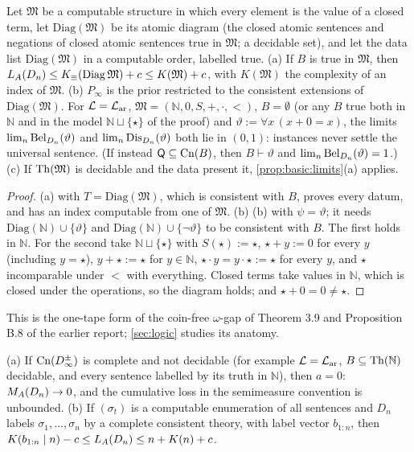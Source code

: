 \begin{proposition}\label{prop:basic:structures}
Let $\mathfrak M$ be a computable structure in which every element is the value of a closed term, let $\mathrm{Diag}(\mathfrak M)$ be its atomic diagram (the closed atomic sentences and negations of closed atomic sentences true in $\mathfrak M$; a decidable set), and let the data list $\mathrm{Diag}(\mathfrak M)$ in a computable order, labelled true.
(a) If $B$ is true in $\mathfrak M$, then $L_{A}(D_n)\le K_{\equiv}(\mathrm{Diag}\,\mathfrak M)+c\le K(\mathfrak M)+c$, with $K(\mathfrak M)$ the complexity of an index of $\mathfrak M$.
(b) $P_\infty$ is the prior restricted to the consistent extensions of $\mathrm{Diag}(\mathfrak M)$. For $\mathcal L=\mathcal{L}_{\mathrm{ar}}$, $\mathfrak M=(\mathbb N,0,S,+,\cdot,<)$, $B=\emptyset$ (or any $B$ true both in $\mathbb N$ and in the model $\mathbb N\sqcup\{\star\}$ of the proof) and $\vartheta:=\forall x\,(x+0=x)$, the limits $\lim_n\mathrm{Bel}_{D_n}(\vartheta)$ and $\lim_n\mathrm{Dis}_{D_n}(\vartheta)$ both lie in $(0,1)$: instances never settle the universal sentence. (If instead $\mathsf{Q}\subseteq\mathrm{Cn}(B)$, then $B\vdash\vartheta$ and $\lim_n\mathrm{Bel}_{D_n}(\vartheta)=1$.)
(c) If $\mathrm{Th}(\mathfrak M)$ is decidable and the data present it, \cref{prop:basic:limits}(a) applies.
\end{proposition}

\begin{proof}
(a)  with $T=\mathrm{Diag}(\mathfrak M)$, which is consistent with $B$, proves every datum, and has an index computable from one of $\mathfrak M$. (b) (b) with $\psi=\vartheta$; it needs $\mathrm{Diag}(\mathbb N)\cup\{\vartheta\}$ and $\mathrm{Diag}(\mathbb N)\cup\{\neg\vartheta\}$ to be consistent with $B$. The first holds in $\mathbb N$. For the second take $\mathbb N\sqcup\{\star\}$ with $S(\star):=\star$, $\star+y:=0$ for every $y$ (including $y=\star$), $y+\star:=\star$ for $y\in\mathbb N$, $\star\cdot y=y\cdot\star:=\star$ for every $y$, and $\star$ incomparable under $<$ with everything. Closed terms take values in $\mathbb N$, which is closed under the operations, so the diagram holds; and $\star+0=0\ne\star$.
\end{proof}

This is the one-tape form of the coin-free $\omega$-gap of Theorem 3.9 and Proposition B.8 of the earlier report; \cref{sec:logic} studies its anatomy.

\begin{proposition}\label{prop:basic:noncomplete}
(a) If $\mathrm{Cn}(D_\infty^\pm)$ is complete and not decidable (for example $\mathcal L=\mathcal{L}_{\mathrm{ar}}$, $B\subseteq\mathrm{Th}(\mathbb N)$ decidable, and every sentence labelled by its truth in $\mathbb N$), then $a=0$: $M_{A}(D_n)\to0$, and the cumulative loss in the semimeasure convention is unbounded.
(b) If $(\sigma_t)$ is a computable enumeration of all sentences and $D_n$ labels $\sigma_1,\dots,\sigma_n$ by a complete consistent theory, with label vector $b_{1:n}$, then $K(b_{1:n}\mid n)-c\le L_{A}(D_n)\le n+K(n)+c$.
\end{proposition}

